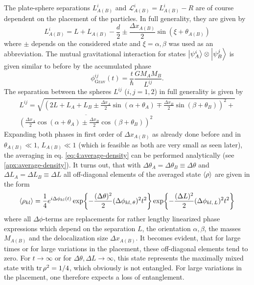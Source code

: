 The plate-sphere separations $L^i_{A(B)}$ and $\mathscr{L}^i_{A(B)} = L^i_{A(B)}-R$ are of course dependent on the placement of the particles.
In full generality, they are given by
\begin{equation}
  L^i_{A(B)} = L + L_{A(B)} - \frac{d}{2} \pm \frac{\Delta x_{A(B)}}{2} \sin(\xi + \theta_{A(B)})
\end{equation}
where $\pm$ depends on the considered state and $\xi = \alpha, \beta$ was used as an abbreviation.
The mutual gravitational interaction for states $\ket{\psi^i_A}\otimes\ket{\psi^j_B}$ is given similar to before by the accumulated phase
\begin{equation}
  \phi^{ij}_\mathrm{Grav}(t) = \frac{t}{\hbar} \frac{G M_A M_B}{L^{ij}} .
\end{equation}
The separation between the spheres $L^{ij}$ ($i,j = 1,2$) in full generality is given by
\begin{multline}
  L^{ij} = \sqrt{\left(2L + L_A + L_B \pm \frac{\Delta x_A}{2}\sin(\alpha + \theta_A) \mp \frac{\Delta x_B}{2}\sin(\beta + \theta_B)\right)^2 +} \\ \overline{\left(\frac{\Delta x_A}{2}\cos(\alpha + \theta_A) \pm \frac{\Delta x_B}{2}\cos(\beta + \theta_B)\right)^2}
\end{multline}
Expanding both phases in first order of $\Delta x_{A(B)}$ as already done before and in $\theta_{A(B)} \ll 1$, $L_{A(B)} \ll 1$ (which is feasible as both are very small as seen later), the averaging in eq. \eqref{eq:4:average-density} can be performed analytically (see \cref{apx:average-density}).
It turns out, that with $\Delta \theta_A = \Delta \theta_B \equiv \Delta\theta$ and $\Delta L_A = \Delta L_B \equiv \Delta L$ all off-diagonal elements of the averaged state $\left\langle\rho\right\rangle$ are given in the form
\begin{equation}\label{eq:4:average-density-element}
  \left\langle\rho_{kl}\right\rangle = \frac{1}{4} e^{i \Delta \phi_{kl}(t)} \exp{-\frac{(\Delta\theta)^2}{2} (\Delta\phi_{kl,\,\theta})^2 t^2} \exp{-\frac{(\Delta L)^2}{2} (\Delta\phi_{kl,\,L})^2 t^2}
\end{equation}
where all $\Delta \phi$-terms are replacements for rather lengthy linearized phase expressions which depend on the separation $L$, the orientation $\alpha, \beta$, the masses $M_{A(B)}$ and the delocalization size $\Delta x_{A(B)}$.
It becomes evident, that for large times or for large variations in the placement, these off-diagonal elements tend to zero. 
For $t\rightarrow \infty$ or for $\Delta \theta, \Delta L \rightarrow \infty$, this state represents the maximally mixed state with $\tr\rho^2 = 1/4$, which obviously is not entangled.
For large variations in the placement, one therefore expects a loss of entanglement.

